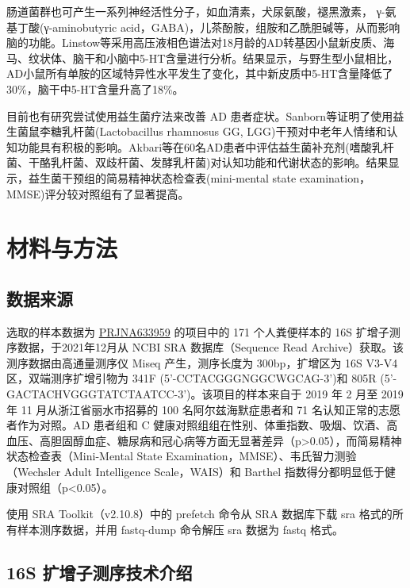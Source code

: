 \documentclass[supercite]{HustGraduPaper}
\begin{document}
肠道菌群也可产生一系列神经活性分子，如血清素，犬尿氨酸，褪黑激素， γ-氨基丁酸(γ-aminobutyric acid，GABA)，儿茶酚胺，组胺和乙酰胆碱等\cite{barrett2012gamma}\cite{lyte2011probiotics}，从而影响脑的功能。Linstow等\cite{von2017effect}采用高压液相色谱法对18月龄的AD转基因小鼠新皮质、海马、纹状体、脑干和小脑中5-HT含量进行分析。结果显示，与野生型小鼠相比，AD小鼠所有单胺的区域特异性水平发生了变化，其中新皮质中5-HT含量降低了30\%，脑干中5-HT含量升高了18\%。

目前也有研究尝试使用益生菌疗法来改善 AD 患者症状。Sanborn等\cite{sanborn2018randomized}证明了使用益生菌鼠李糖乳杆菌(Lactobacillus rhamnosus GG, LGG)干预对中老年人情绪和认知功能具有积极的影响。Akbari等\cite{akbari2016effect}在60名AD患者中评估益生菌补充剂(嗜酸乳杆菌、干酪乳杆菌、双歧杆菌、发酵乳杆菌)对认知功能和代谢状态的影响。结果显示，益生菌干预组的简易精神状态检查表(mini-mental state examination，MMSE)评分较对照组有了显著提高。



\section{材料与方法}

\subsection{数据来源}

选取的样本数据为 \href{https://www.ncbi.nlm.nih.gov/bioproject/PRJNA633959}{ PRJNA633959} 的项目中的 171 个人粪便样本的 16S 扩增子测序数据\cite{data}，于2021年12月从 NCBI SRA 数据库（Sequence Read Archive）获取。该测序数据由高通量测序仪 Miseq 产生，测序长度为 300bp，扩增区为 16S V3-V4 区，双端测序扩增引物为 341F (5'-CCTACGGGNGGCWGCAG-3')和 805R (5'-GACTACHVGGGTATCTAATCC-3')。该项目的样本来自于 2019 年 2 月至 2019 年 11 月从浙江省丽水市招募的 100 名阿尔兹海默症患者和 71 名认知正常的志愿者作为对照。AD 患者组和 C 健康对照组组在性别、体重指数、吸烟、饮酒、高血压、高胆固醇血症、糖尿病和冠心病等方面无显著差异（p>0.05），而简易精神状态检查表（Mini-Mental State Examination，MMSE）、韦氏智力测验 （Wechsler Adult Intelligence Scale，WAIS）和 Barthel 指数得分都明显低于健康对照组（p<0.05）。

使用 SRA Toolkit\cite{leinonen2010sequence}（v2.10.8）中的 prefetch 命令从 SRA 数据库下载 sra 格式的所有样本测序数据，并用 fastq-dump 命令解压 sra 数据为 fastq 格式。

\subsection{16S 扩增子测序技术介绍}
\end{document}
